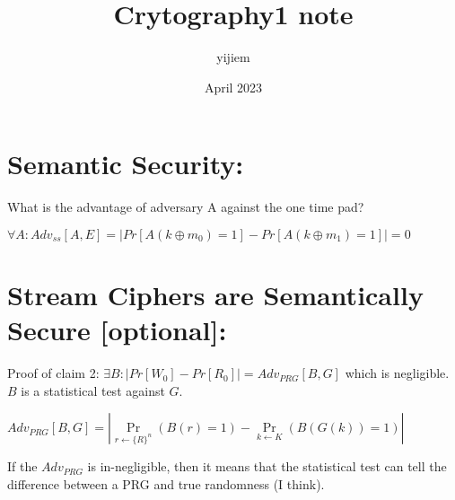 \documentclass{article}
\title{Crytography1 note}
\author{yijiem }
\date{April 2023}
\begin{document}
\maketitle

\section*{Semantic Security:}

What is the advantage of adversary A against the one time pad?

$\forall A:Adv_{ss}[A,E]=|Pr[A(k\oplus m_{0})=1]-Pr[A(k\oplus m_{1})=1]|=0$

\section*{Stream Ciphers are Semantically Secure [optional]:}

Proof of claim 2: $\exists B: |Pr[W_{0}]-Pr[R_{0}]|=Adv_{PRG}[B,G]$ which is negligible. $B$ is a statistical test against $G$.

$Adv_{PRG}[B,G]=|\Pr\limits_{r\gets \{R\}^n}(B(r)=1)-\Pr\limits_{k\gets K}(B(G(k))=1)|$

If the $Adv_{PRG}$ is in-negligible, then it means that the statistical test can tell the difference between a PRG and true randomness (I think).
\end{document}
